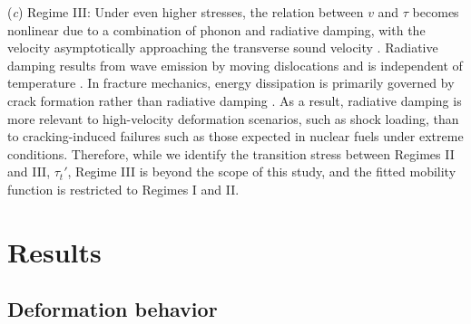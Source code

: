 \documentclass[applsci,article,submit,pdftex,moreauthors]{Definitions/mdpi}
\newcommand{\?}{\stackrel{?}{=}}
\begin{document}
(\textit{c}) Regime III: Under even higher stresses, the relation between $v$ and $\tau$ becomes nonlinear due to a combination of phonon and radiative damping, with the velocity asymptotically approaching the transverse sound velocity \cite{Dang2019}. Radiative damping results from wave emission by moving dislocations and is independent of temperature \cite{Kresse2004}. In fracture mechanics, energy dissipation is primarily governed by crack formation rather than radiative damping \cite{Kresse2004}. As a result, radiative damping is more relevant to high-velocity deformation scenarios, such as shock loading, than to cracking-induced failures such as those expected in nuclear fuels under extreme conditions. Therefore, while we identify the transition stress between Regimes II and III, $\tau_t'$, Regime III is beyond the scope of this study, and the fitted mobility function is restricted to Regimes I and II.



\section{Results}

\subsection{Deformation behavior}
\label{Sec:SS}
\end{document}
